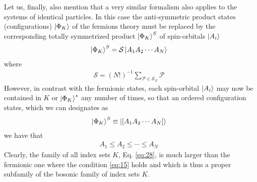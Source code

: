 \documentclass{book}
\renewcommand{\ket}[1]{\Ket{#1}}
\begin{document}
Let us, finally, also mention that a very similar formalism also applies to the systems of identical particles. In this case the anti-symmetric product states (configurations) $\ket{\Phi_K}$ of the fermions theory must be replaced by the corresponding totally symmetrized product $\ket{\Phi_K}^S$ of spin-orbitals $\ket{A_i}$ 
\begin{align}
    \ket{\Phi_K}^S = \mathcal{S} \ket{A_1A_2\cdots A_N}
\end{align}
where
\begin{align}
    \mathcal{S} = (N!)^{-1} \sum_{\mathcal{P}\in \mathcal{S}_N}\mathcal{P}
\end{align}
However, in contrast with the fermionic states, each spin-orbital $\ket{A_i}$ may now be contained in $K$ or $\ket{\Phi_K}^s$ any number of times, so that an ordered configuration states, which we can designates as 
\begin{align}
    \ket{\Phi_K}^S \equiv \ket{[A_1A_2\cdots A_N]}
\end{align}
we have that
\begin{align}
    A_1\leqslant A_2\leqslant \cdots\leqslant  A_N
    \label{eq:28}
\end{align}
Clearly, the family of all index sets $K$, Eq. \eqref{eq:28}, is much larger than the fermionic one where the condition \eqref{eq:15} holds and which is thus a proper subfamily of the bosonic family of index sets $K$.










\end{document}
